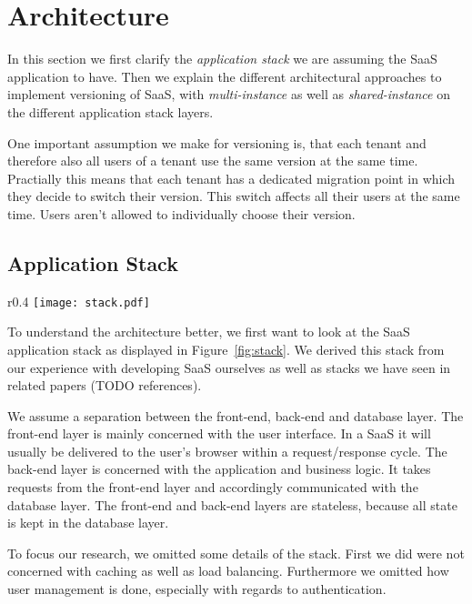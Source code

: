 \section{Architecture}
\label{sec:architecture}

In this section we first clarify the \emph{application stack} we are assuming the SaaS application to have. Then we explain the different architectural approaches to implement versioning of SaaS, with \emph{multi-instance} as well as \emph{shared-instance} on the different application stack layers.

One important assumption we make for versioning is, that each tenant and therefore also all users of a tenant use the same version at the same time. Practially this means that each tenant has a dedicated migration point in which they decide to switch their version. This switch affects all their users at the same time. Users aren't allowed to individually choose their version.

\subsection{Application Stack}

\begin{wrapfigure}{r}{0.4\textwidth}
\centering
\texttt{[image: stack.pdf]}
\caption{Simplified Application Stack}
\label{fig:stack}
\end{wrapfigure}

To understand the architecture better, we first want to look at the SaaS application stack as displayed in Figure~\ref{fig:stack}. We derived this stack from our experience with developing SaaS ourselves as well as stacks we have seen in related papers (TODO references).

We assume a separation between the front-end, back-end and database layer. The front-end layer is mainly concerned with the user interface. In a SaaS it will usually be delivered to the user's browser within a request/response cycle. The back-end layer is concerned with the application and business logic. It takes requests from the front-end layer and accordingly communicated with the database layer. The front-end and back-end layers are stateless, because all state is kept in the database layer.

To focus our research, we omitted some details of the stack. First we did were not concerned with caching as well as load balancing. Furthermore we omitted how user management is done, especially with regards to authentication.


